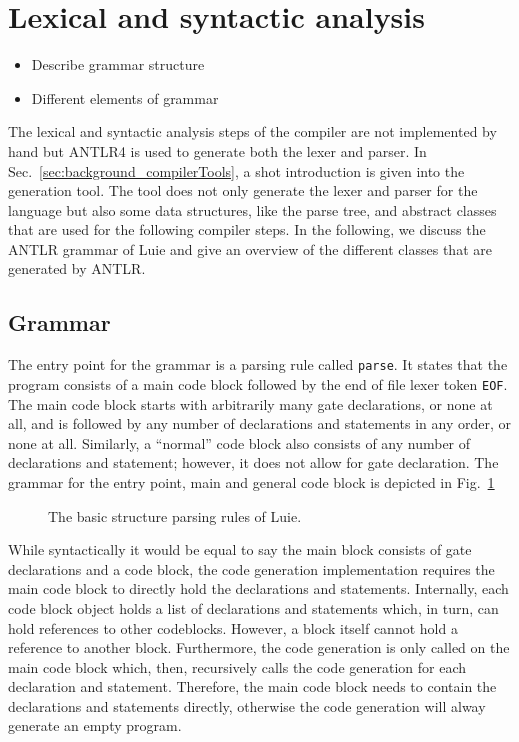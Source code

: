 \section{Lexical and syntactic analysis}
\begin{itemize}
    \item Describe grammar structure
    \item Different elements of grammar
\end{itemize}
The lexical and syntactic analysis steps of the compiler are not implemented by hand but ANTLR4 is used to generate both the lexer and parser. In Sec.~\ref{sec:background_compilerTools}, a shot introduction is given into the generation tool. The tool does not only generate the lexer and parser for the language but also some data structures, like the parse tree, and abstract classes that are used for the following compiler steps. In the following, we discuss the ANTLR grammar of Luie and give an overview of the different classes that are generated by ANTLR.

\subsection{Grammar}
The entry point for the grammar is a parsing rule called \texttt{parse}. It states that the program consists of a main code block followed by the end of file lexer token \texttt{EOF}. The main code block starts with arbitrarily many gate declarations, or none at all, and is followed by any number of declarations and statements in any order, or none at all. Similarly, a ``normal'' code block also consists of any number of declarations and statement; however, it does not allow for gate declaration. The grammar for the entry point, main and general code block is depicted in Fig.~\ref{fig:implementation_grammarStructure}

\begin{figure}[htp]
    \centering
    
    \caption{The basic structure parsing rules of Luie.}
    \label{fig:implementation_grammarStructure}
\end{figure}

While syntactically it would be equal to say the main block consists of gate declarations and a code block, the code generation implementation requires the main code block to directly hold the declarations and statements. Internally, each code block object holds a list of declarations and statements which, in turn, can hold references to other codeblocks. However, a block itself cannot hold a reference to another block. Furthermore, the code generation is only called on the main code block which, then, recursively calls the code generation for each declaration and statement. Therefore, the main code block needs to contain the declarations and statements directly, otherwise the code generation will alway generate an empty program. 


